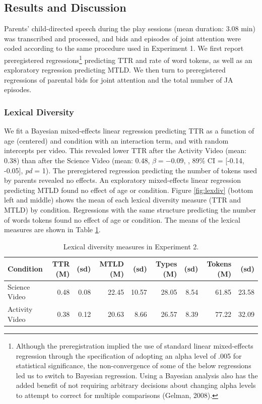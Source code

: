 \documentclass[man,floatsintext]{apa6}
\begin{document}
\hypertarget{results-and-discussion-1}{%
\subsection{Results and Discussion}\label{results-and-discussion-1}}

Parents' child-directed speech during the play sessions (mean duration: 3.08 min) was transcribed and processed, and bids and episodes of joint attention were coded according to the same procedure used in Experiment 1.
We first report preregistered regressions\footnote{Although the preregistration implied the use of standard linear mixed-effects regression through the specification of adopting an alpha level of .005 for statistical significance, the non-convergence of some of the below regressions led us to switch to Bayesian regression. Using a Bayesian analysis also has the added benefit of not requiring arbitrary decisions about changing alpha levels to attempt to correct for multiple comparisons (Gelman, 2008).} predicting TTR and rate of word tokens, as well as an exploratory regression predicting MTLD.
We then turn to preregistered regressions of parental bids for joint attention and the total number of JA episodes.

\hypertarget{lexical-diversity-1}{%
\subsubsection{Lexical Diversity}\label{lexical-diversity-1}}

We fit a Bayesian mixed-effects linear regression predicting TTR as a function of age (centered) and condition with an interaction term, and with random intercepts per video.
This revealed lower TTR after the Activity Video (mean: 0.38) than after the Science Video (mean: 0.48, \(\beta=-0.09\), , 89\% CI = {[}-0.14, -0.05{]}, \emph{pd} = 1).
The preregistered regression predicting the number of tokens used by parents revealed no effects.
An exploratory mixed-effects linear regression predicting MTLD found no effect of age or condition.
Figure \ref{fig:lexdiv} (bottom left and middle) shows the mean of each lexical diversity measure (TTR and MTLD) by condition.
Regressions with the same structure predicting the number of words tokens found no effect of age or condition.
The means of the lexical measures are shown in Table \ref{e2tab}.

\begin{table}

\caption{\label{tab:e2tab}\label{e2tab} Lexical diversity measures in Experiment 2.}
\centering
\begin{tabular}[t]{l|r|r|r|r|r|r|r|r}
\hline
Condition & TTR (M) & (sd) & MTLD (M) & (sd) & Types (M) & (sd) & Tokens (M) & (sd)\\
\hline
Science Video & 0.48 & 0.08 & 22.45 & 10.57 & 28.05 & 8.54 & 61.85 & 23.58\\
\hline
Activity Video & 0.38 & 0.12 & 20.63 & 8.66 & 26.57 & 8.39 & 77.22 & 32.09\\
\hline
\end{tabular}
\end{table}
\end{document}
